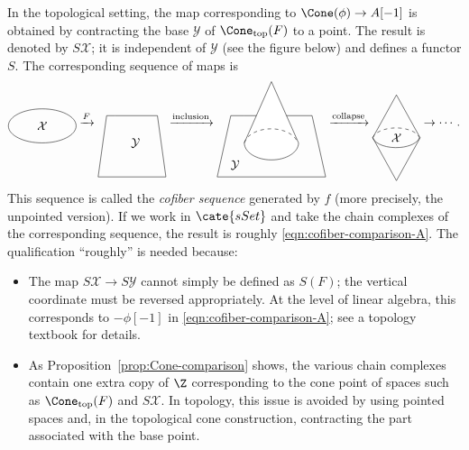 In the topological setting, the map corresponding to
$\Cone(\phi)\to A[-1]$ is obtained by contracting the base
$\mathcal{Y}$ of $\Cone_{\mathrm{top}}(F)$ to a point. The result is denoted
by $S\mathcal{X}$; it is independent of $\mathcal{Y}$ (see the figure below)
and defines a functor $S$. The corresponding sequence of maps is
\begin{equation*}
	\begin{tikzpicture}[baseline=(O)]
		\draw (1, 0) ellipse[x radius=1, y radius=0.5] node {$\mathcal{X}$};
		\coordinate (O) at (0, 0);
	\end{tikzpicture}
	\xrightarrow{F}
	\begin{tikzpicture}[baseline=(O), xscale=0.5]
		\draw (0, 0.8) -- (-0.5, 0.8) -- (-1, -1) -- (3, -1) -- (2.5, 0.8) --cycle;
		\node at (1.2, 0) {$\mathcal{Y}$};
		\coordinate (O) at (0, 0.5);
	\end{tikzpicture}
	\xrightarrow{\text{inclusion}}
	\begin{tikzpicture}[baseline=(O), xscale=0.8]
		\draw (0, 0.8) -- (-0.5, 0.8) -- (-1, -1) node[xshift=1.5em,  yshift=1em] {$\mathcal{Y}$} -- (3, -1) -- (2.5, 0.8) --cycle;
		\filldraw[fill=white] (1, 1.8) -- (0, 0) arc[start angle=180, end angle=360, x radius=1, y radius=0.5] --cycle;
		\draw[dashed] (0, 0) arc[start angle=170, end angle=10, x radius=1, y radius=0.5];
		\coordinate (O) at (0, 0.5);
	\end{tikzpicture}
	\xrightarrow{\text{collapse}}
	\begin{tikzpicture}[baseline=(O), xscale=0.7, yscale=0.7]
		\draw (2, 0) -- (1, 1.8) -- (0, 0);
		\draw[dashed] (0, 0) arc[start angle=170, end angle=10, x radius=1, y radius=0.5];
		\draw (0, 0) arc[start angle=190, end angle=350, x radius=1, y radius=0.5];
		\node at (1, 0) {$\mathcal{X}$};
		\draw (0, 0) -- (1, -1.8) -- (2, 0);
		\coordinate (O) at (0, 0.5);
	\end{tikzpicture}
	\to \cdots .
\end{equation*}
This sequence is called the \emph{cofiber sequence} generated by $f$ (more
precisely, the unpointed version). If we work in $\cate{sSet}$ and take the
chain complexes of the corresponding sequence, the result is roughly
\eqref{eqn:cofiber-comparison-A}. The qualification ``roughly'' is needed
because:
\begin{itemize}
	\item The map $S\mathcal{X}\to S\mathcal{Y}$ cannot simply be defined as
	$S(F)$; the vertical coordinate must be reversed appropriately. At the
	level of linear algebra, this corresponds to $-\phi[-1]$ in
	\eqref{eqn:cofiber-comparison-A}; see a topology textbook for details.
	\item As Proposition~\ref{prop:Cone-comparison} shows, the various chain
	complexes contain one extra copy of $\Z$ corresponding to the cone point
	of spaces such as $\Cone_{\mathrm{top}}(F)$ and $S\mathcal{X}$. In
	topology, this issue is avoided by using pointed spaces and, in the
	topological cone construction, contracting the part associated with the
	base point.
\end{itemize}

